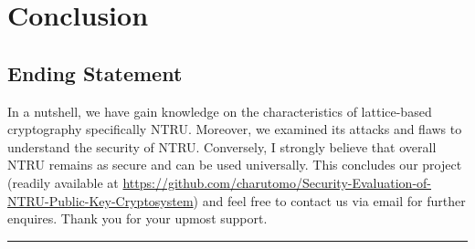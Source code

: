\chapter{Conclusion}
\section{Ending Statement}
In a nutshell, we have gain knowledge on the characteristics of lattice-based cryptography specifically NTRU.
Moreover, we examined its attacks and flaws to understand the security of NTRU.
Conversely, I strongly believe that overall NTRU remains as secure and can be used universally. 
This concludes our project (readily available at \url{https://github.com/charutomo/Security-Evaluation-of-NTRU-Public-Key-Cryptosystem}) and feel free to contact us via email for further enquires. Thank you for your upmost support.\\
\par\noindent\rule{\textwidth}{0.4pt}
